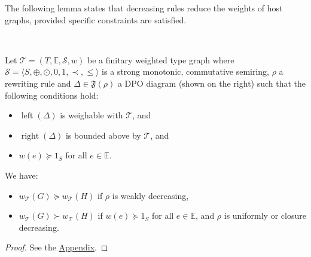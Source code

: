The following lemma states that decreasing rules reduce the weights of host graphs, provided specific constraints are satisfied.
\begin{lemma}
    \label{lem:decreasing_step}
    \ \newline 
\begin{minipage}{0.7\textwidth}
    Let $\mathcal{T} = (T,\mathbb{E}, \mathcal{S}, w)$ be a finitary weighted type graph where $\mathcal{S} = \langle S, \oplus, \odot, 0, 1, \prec, \leq \rangle$ is a strong monotonic, commutative semiring, $\rho$ a rewriting rule and $\Delta \in \mathfrak{F}(\rho)$ a DPO diagram
    (shown on the right)   such that the following conditions hold:
\end{minipage}  
\begin{minipage}{0.3\textwidth}
    \begin{center}
      \end{center}
\end{minipage}
   \begin{itemize}
       \item $\operatorname{left}(\Delta)$ is weighable with \(\mathcal{T}\), and
       \item $\operatorname{right}(\Delta)$ is bounded above by \(\mathcal{T}\), and
       \item $w(e) \succeq 1_S$ for all $e \in \mathbb{E}$.
   \end{itemize}

   \noindent
  We have:
   \begin{itemize}
       \item $w_\mathcal{T}(G) \succeq w_\mathcal{T}(H)$ if $\rho$ is weakly decreasing,
       \item $w_\mathcal{T}(G) \succ w_\mathcal{T}(H)$ if $w(e) \succeq 1_S$ for all $e \in \mathbb{E}$, and $\rho$ is uniformly or closure decreasing.
   \end{itemize}
\end{lemma} 
\begin{proof}
   See the \hyperref[proof:decreasing_step]{Appendix}.
\end{proof}
